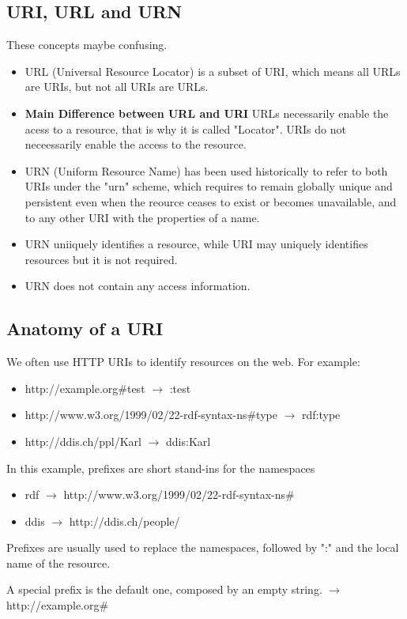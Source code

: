 \documentclass{article}
\theoremstyle{definition}
\begin{document}
\subsection{URI, URL and URN}

These concepts maybe confusing. 

\begin{itemize}
    \item URL (Universal Resource Locator) is a subset of URI, which means all URLs are URIs, but not all URIs are URLs.
    \item \textbf{Main Difference between URL and URI} URLs necessarily enable the acess to a resource, that is why it is called "Locator". URIs do not neceessarily enable the access to the resource.
    \item URN (Uniform Resource Name) has been used historically to refer to both URIs under the "urn" scheme, which requires to remain globally unique and persistent even when the reource ceases to exist or becomes unavailable, and to any other URI with the properties of a name.
    \item URN uniiquely identifies a resource, while URI may uniquely identifies resources but it is not required.
    \item URN does not contain any access information.
\end{itemize}

\subsection{Anatomy of a URI}

We often use HTTP URIs to identify resources on the web. For example:

\begin{itemize}
    \item http://example.org#test $\rightarrow$ :test
    \item http://www.w3.org/1999/02/22-rdf-syntax-ns#type $\rightarrow$ rdf:type
    \item http://ddis.ch/ppl/Karl $\rightarrow$ ddis:Karl
\end{itemize}

In this example, prefixes are short stand-ins for the namespaces

\begin{itemize}
    \item rdf $\rightarrow$ http://www.w3.org/1999/02/22-rdf-syntax-ns#
    \item ddis $\rightarrow$ http://ddis.ch/people/
\end{itemize}

Prefixes are usually used to replace the namespaces, followed by ":" and the local name of the resource.

A special prefix is the default one, composed by an empty string. $\rightarrow$ http://example.org#
\end{document}
